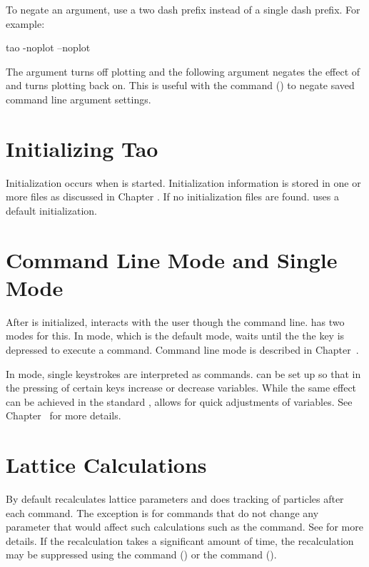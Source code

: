 To negate an argument, use a two dash prefix instead of a single dash prefix. For example:
\begin{example}
  tao -noplot --noplot
\end{example}
The  argument turns off plotting and the following  argument negates the
effect of  and turns plotting back on. This is useful with the  command
() to negate saved command line argument settings.

\section{Initializing Tao}
\label{s:initializing}

Initialization occurs when \tao is started. Initialization information is stored in one or more
files as discussed in Chapter . If no initialization files are found. \tao uses a
default initialization.

\section{Command Line Mode and Single Mode}
\label{s:modes}

After \tao is initialized, \tao interacts with the user though the command line. \tao has two modes
for this. In  mode, which is the default mode, \tao waits until the the 
key is depressed to execute a command. Command line mode is described in Chapter~. 

In  mode, single keystrokes are interpreted as commands. \tao can be set up so that in
 the pressing of certain keys increase or decrease variables. While the same effect
can be achieved in the standard ,  allows for quick adjustments of
variables. See Chapter~ for more details.

\section{Lattice Calculations}
\label{s:lat.calc.overview} 

By default \tao recalculates lattice parameters and does tracking of particles after each command.
The exception is for commands that do not change any parameter that would affect such calculations
such as the  command. See  for more details. If the recalculation takes a
significant amount of time, the recalculation may be suppressed using the  command () or the  command
().

